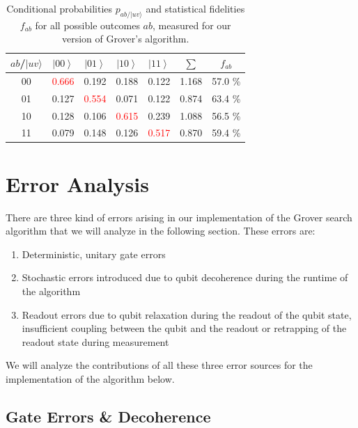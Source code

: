 \begin{table}[H]
\begin{centering}
\begin{tabular}{|c|c|c|c|c|c|c|}
\hline 
$ab$/$|uv\rangle$ & $\left|00\right\rangle $ & $\left|01\right\rangle $ & $\left|10\right\rangle $ & $\left|11\right\rangle $ & $\sum$ & $f_{ab}$\tabularnewline
\hline
\hline 
00 & \textcolor{red}{0.666} & 0.192 & 0.188 & 0.122 & 1.168 & 57.0 \%\tabularnewline
\hline 
01 & 0.127 & \textcolor{red}{0.554} & 0.071 & 0.122 & 0.874 & 63.4 \%\tabularnewline
\hline 
10 & 0.128 & 0.106 & \textcolor{red}{0.615} & 0.239 & 1.088 & 56.5 \%\tabularnewline
\hline 
11 & 0.079 & 0.148 & 0.126 & \textcolor{red}{0.517} & 0.870 & 59.4 \%\tabularnewline
\hline
\end{tabular}
\par\end{centering}

\caption{\label{tab:Probabilities-for-obtaining}Conditional probabilities
$p_{ab/|uv\rangle}$ and statistical fidelities $f_{ab}$ for all
possible outcomes $ab$, measured for our version of Grover's algorithm.}

\end{table}

\section{Error Analysis}

There are three kind of errors arising in our implementation of the Grover search algorithm that we will analyze in the following section. These errors are:

\begin{enumerate}
	\item Deterministic, unitary gate errors
	\item Stochastic errors introduced due to qubit decoherence during the runtime of the algorithm
	\item Readout errors due to qubit relaxation during the readout of the qubit state, insufficient coupling between the qubit and the readout or retrapping of the readout state during measurement
\end{enumerate}

We will analyze the contributions of all these three error sources for the implementation of the algorithm below.
\subsection{Gate Errors \& Decoherence}

